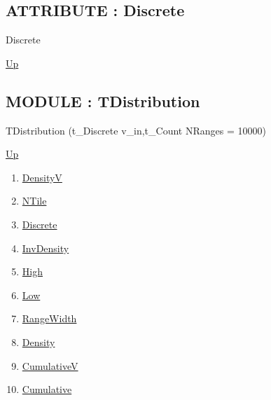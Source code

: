 \par
\par
\subsection*{ATTRIBUTE : Discrete}
\hypertarget{ecldoc:linearregression.ols.distributionbase.discrete}{}
\begin{minipage}[t]{\textwidth}
\begin{flushleft}
 Discrete 
\end{flushleft}
\end{minipage}
\hyperlink{ecldoc:linearregression.ols.distributionbase}{Up}

\par
\par

\subsection*{MODULE : TDistribution}
\hypertarget{ecldoc:linearregression.ols.tdistribution}{}
\begin{minipage}[t]{\textwidth}
\begin{flushleft}
 TDistribution (t\_Discrete v\_in,t\_Count NRanges = 10000)
\end{flushleft}
\end{minipage}
\hyperlink{ecldoc:linearregression.ols}{Up}

\par
\par
\begin{enumerate}
\item \hyperlink{ecldoc:linearregression.ols.distributionbase.densityv}{DensityV}
\item \hyperlink{ecldoc:linearregression.ols.distributionbase.ntile}{NTile}
\item \hyperlink{ecldoc:linearregression.ols.distributionbase.discrete}{Discrete}
\item \hyperlink{ecldoc:linearregression.ols.tdistribution.invdensity}{InvDensity}
\item \hyperlink{ecldoc:linearregression.ols.tdistribution.high}{High}
\item \hyperlink{ecldoc:linearregression.ols.tdistribution.low}{Low}
\item \hyperlink{ecldoc:linearregression.ols.tdistribution.rangewidth}{RangeWidth}
\item \hyperlink{ecldoc:linearregression.ols.tdistribution.density}{Density}
\item \hyperlink{ecldoc:linearregression.ols.tdistribution.cumulativev}{CumulativeV}
\item \hyperlink{ecldoc:linearregression.ols.tdistribution.cumulative}{Cumulative}
\end{enumerate}
